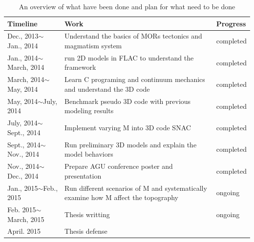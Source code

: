 \documentclass[12pt]{article}
\begin{document}
\begin{table}[hc]
\begin{small}
\begin{center}
\begin{tabular}{|l|p{7cm}|l|}
\hline
Timeline & Work & Progress\\
\hline
Dec., 2013$\sim$Jan., 2014& Understand the basics of MORs tectonics and magmatism system & completed\\ \hline
Jan., 2014$\sim$March, 2014& run 2D models in FLAC to understand the framework& completed\\ \hline
March, 2014$\sim$May, 2014& Learn C programing and continuum mechanics and understand the 3D code& completed\\ \hline
May, 2014$\sim$July, 2014& Benchmark pseudo 3D code with previous modeling results& completed\\ \hline
July, 2014$\sim$Sept., 2014& Implement varying M into 3D code SNAC& completed\\ \hline
Sept., 2014$\sim$Nov., 2014& Run preliminary 3D models and explain the model behaviors& completed\\ \hline
Nov., 2014$\sim$Dec., 2014& Prepare AGU conference poster and presentation& completed\\ \hline

Jan., 2015$\sim$Feb., 2015  & Run different scenarios of M and systematically examine how M affect the topography & ongoing\\ \hline
Feb. 2015$\sim$March, 2015 & Thesis writting & ongoing\\ \hline
April. 2015 & Thesis defense & \\ \hline
\end{tabular}
\end{center}
\end{small}
\caption{An overview of what have been done and plan for what need to be done}
\label{tab:plan}
\end{table}



\break
\begin{footnotesize}




\end{footnotesize}
\end{document}
